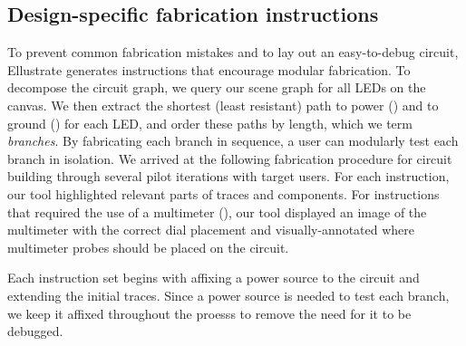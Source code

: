 \documentclass{sigchi}
\begin{document}
    \subsection{Design-specific fabrication instructions}
        To prevent common fabrication mistakes and to lay out an easy-to-debug circuit, Ellustrate generates instructions that encourage modular fabrication. To decompose the circuit graph, we query our scene graph for all LEDs on the canvas. We then extract the shortest (least resistant) path to power () and to ground () for each LED, and order these paths by length, which we term \textit{branches}. By fabricating each branch in sequence, a user can modularly test each branch in isolation. We arrived at the following fabrication procedure for circuit building through several pilot iterations with target users. For each instruction, our tool highlighted relevant parts of traces and components. For instructions that required the use of a multimeter (), our tool displayed an image of the multimeter with the correct dial placement and visually-annotated where multimeter probes should be placed on the circuit. 

        Each instruction set begins with affixing a power source to the circuit and extending the initial traces. Since a power source is needed to test each branch, we keep it affixed throughout the proesss to remove the need for it to be debugged.
        
        \noindent{}
\end{document}

